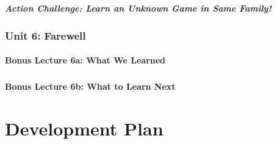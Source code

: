 \documentclass[12pt]{article}
\begin{document}
      \subsubsection*{Action Challenge: Learn an Unknown Game in Same Family!}
    \newpage

  \section*{\sc Unit 6: Farewell}
    \subsection*{Bonus Lecture 6a: What We Learned}
      \subsubsection*{}
      \subsubsection*{}
      \subsubsection*{}
      \subsubsection*{}
      \subsubsection*{}


    \subsection*{Bonus Lecture 6b: What to Learn Next}
      \subsubsection*{}
      \subsubsection*{}
      \subsubsection*{}
      \subsubsection*{}
      \subsubsection*{}
    \newpage


\part{Development Plan}
\end{document}
